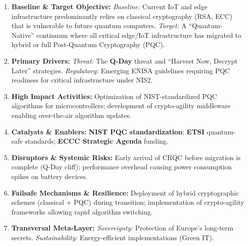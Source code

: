 \documentclass[12pt,a4paper]{report}
\begin{document}
\begin{enumerate}
\item \textbf{Baseline \& Target Objective:}
\textit{Baseline:} Current IoT and edge infrastructure predominantly relies on classical cryptography (RSA, ECC) that is vulnerable to future quantum computers.
\textit{Target:} A ``Quantum-Native'' continuum where all critical edge/IoT infrastructure has migrated to hybrid or full Post-Quantum Cryptography (PQC).

\item \textbf{Primary Drivers:} 
\textit{Threat:} The \textbf{Q-Day} threat and ``Harvest Now, Decrypt Later'' strategies.
\textit{Regulatory:} Emerging ENISA guidelines requiring PQC readiness for critical infrastructure under NIS2.

\item \textbf{High Impact Activities:} 
Optimization of NIST-standardized PQC algorithms for microcontrollers; development of crypto-agility middleware enabling over-the-air algorithm updates.

\item \textbf{Catalysts \& Enablers:} 
\textbf{NIST PQC standardization}; \textbf{ETSI} quantum-safe standards; \textbf{ECCC Strategic Agenda} funding.

\item \textbf{Disruptors \& Systemic Risks:} 
Early arrival of CRQC before migration is complete (Q-Day cliff); performance overhead causing power consumption spikes on battery devices.

\item \textbf{Failsafe Mechanisms \& Resilience:} 
Deployment of hybrid cryptographic schemes (classical + PQC) during transition; implementation of crypto-agility frameworks allowing rapid algorithm switching.

\item \textbf{Transversal Meta-Layer:} 
\textit{Sovereignty:} Protection of Europe's long-term secrets. \textit{Sustainability:} Energy-efficient implementations (Green IT).
\end{enumerate}
\end{document}
